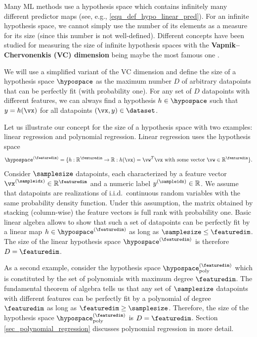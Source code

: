 \documentclass[12pt]{report}
\newcommand{\sizehypospace}{D}
\newcommand{\featurelen}{\featuredim}
\begin{document}
Many ML methods use a hypothesis space which contains 
infinitely many different predictor maps (see, e.g., \eqref{equ_def_hypo_linear_pred}). 
For an infinite hypothesis space, we cannot simply use the 
number of its elements as a measure for its size (since this number 
is not well-defined). Different concepts have been studied for 
measuring the size of infinite hypothesis spaces with the {\bf Vapnik–Chervonenkis (VC) dimension} 
being maybe the most famous one \cite{VapnikBook}. 

We will use a simplified variant of the VC dimension and define the 
size of a hypothesis space $\hypospace$ as the maximum number 
$\sizehypospace$ of arbitrary datapoints that can be perfectly fit 
(with probability one). For any set of $\sizehypospace$ datapoints 
with different features, we can always find a hypothesis $h \in \hypospace$ 
such that $y=h(\vx)$ for all datapoints $(\vx,y) \in \dataset$. 

Let us illustrate our concept for the size of a hypothesis space 
with two examples: linear regression and polynomial regression. 
Linear regression uses the hypothesis space 
$$\hypospace^{(\featuredim)} = \{ h: \mathbb{R}^{\featuredim} \rightarrow \mathbb{R}: h(\vx) = \vw^{T} \vx \mbox{ with some vector } \vw \in \mathbb{R}^{\featurelen}\}.$$ 
Consider $\samplesize$ datapoints, each characterized by a feature 
vector $\vx^{(\sampleidx)} \in \mathbb{R}^{\featuredim}$ and a numeric label 
$y^{(\sampleidx)} \in \mathbb{R}$. We assume that datapoints are 
realizations of i.i.d.\ continuous random variables with the same 
probability density function. 
Under this assumption, the matrix obtained by stacking (column-wise) the 
feature vectors is full rank with probability one. Basic linear algebra allows to show that 
such a set of datapoints can be perfectly fit by a linear map $h \in \hypospace^{(\featuredim)}$ 
as long as $\samplesize \leq \featuredim$. The size of the linear 
hypothesis space $\hypospace^{(\featuredim)}$ is therefore $\sizehypospace = \featuredim$. 

As a second example, consider the hypothesis space 
$\hypospace_{\rm poly}^{(\featuredim)}$ which is constituted 
by the set of polynomials with maximum degree $\featuredim$. 
The fundamental theorem of algebra tells us that any set 
of $\samplesize$ datapoints with different features can 
be perfectly fit by a polynomial of degree $\featuredim$ 
as long as $\featuredim \geq \samplesize$. Therefore, the 
size of the hypothesis space $\hypospace_{\rm poly}^{(\featuredim)}$ 
is $\sizehypospace=\featuredim$. Section \ref{sec_polynomial_regression} 
discusses polynomial regression in more detail. 
\end{document}
